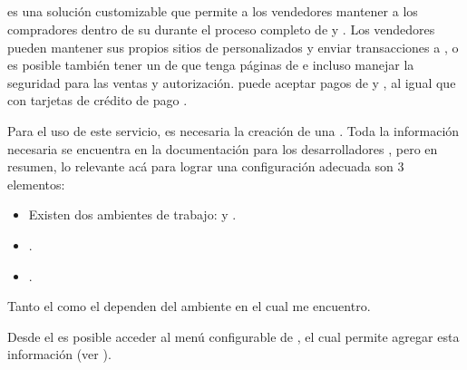 		\subsection*{\PPPaymentProNAME}\label{chapter:solucionImplementada:dashboard:payment:subsection:paypal_pro}
			\PPPaymentProNAME es una solución customizable que permite a los vendedores mantener a los compradores dentro de su \websiteINT durante el proceso completo de \paymentsCOM y \checkoutCOM. Los vendedores pueden mantener sus propios sitios de \checkoutCOM personalizados y enviar transacciones a \paypalNAME, o es posible también tener un \hostCPT de \paypalNAME que tenga páginas de \checkoutCOM e incluso manejar la seguridad para las ventas y autorización. \PPPaymentProNAME puede aceptar pagos de \paypalNAME y  \paypalCreditNAME, al igual que con tarjetas de crédito de pago \cite{online_paypal_developer_acceptpayments}.

			Para el uso de este servicio, es necesaria la creación de una \paypalNAME \appINT. Toda la información necesaria se encuentra en la documentación para los desarrolladores \cite{online_paypal_developer_apps_credentials}, pero en resumen, lo relevante acá para lograr una configuración adecuada son 3 elementos:

				\begin{itemize}
					\item Existen dos ambientes de trabajo: \sandboxEnvPL y \liveEnvPL.
					\item \clientIDPayPal.
					\item \secretPayPal.
				\end{itemize}

			Tanto el \clientIDPayPal como el \secretPayPal dependen del ambiente en el cual me encuentro.

			Desde el \dashboardEF es posible acceder al menú configurable de \paypalNAME, el cual permite agregar esta información (ver ).

